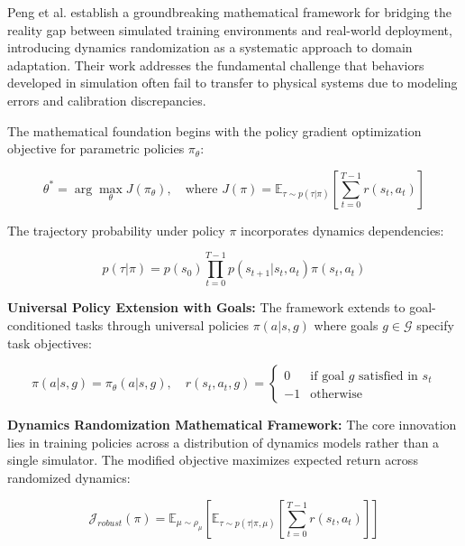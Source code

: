 \documentclass[journal]{IEEEtran}
\begin{document}
Peng et al. \cite{peng2018sim} establish a groundbreaking mathematical framework for bridging the reality gap between simulated training environments and real-world deployment, introducing dynamics randomization as a systematic approach to domain adaptation. Their work addresses the fundamental challenge that behaviors developed in simulation often fail to transfer to physical systems due to modeling errors and calibration discrepancies.

The mathematical foundation begins with the policy gradient optimization objective for parametric policies $\pi_\theta$:

\begin{equation}
\theta^* = \arg\max_\theta J(\pi_\theta), \quad \text{where } J(\pi) = \mathbb{E}_{\tau \sim p(\tau|\pi)}\left[\sum_{t=0}^{T-1} r(s_t, a_t)\right]
\label{eq:peng_policy_gradient}
\end{equation}

The trajectory probability under policy $\pi$ incorporates dynamics dependencies:

\begin{equation}
p(\tau|\pi) = p(s_0) \prod_{t=0}^{T-1} p(s_{t+1}|s_t, a_t) \pi(s_t, a_t)
\label{eq:peng_trajectory_probability}
\end{equation}

\textbf{Universal Policy Extension with Goals:} 
The framework extends to goal-conditioned tasks through universal policies $\pi(a|s,g)$ where goals $g \in \mathcal{G}$ specify task objectives:

\begin{equation}
\pi(a|s,g) = \pi_\theta(a|s,g), \quad r(s_t, a_t, g) = \begin{cases}
0 & \text{if goal } g \text{ satisfied in } s_t \\
-1 & \text{otherwise}
\end{cases}
\label{eq:peng_universal_policy}
\end{equation}

\textbf{Dynamics Randomization Mathematical Framework:}
The core innovation lies in training policies across a distribution of dynamics models rather than a single simulator. The modified objective maximizes expected return across randomized dynamics:

\begin{equation}
\mathcal{J}_{robust}(\pi) = \mathbb{E}_{\mu \sim \rho_\mu} \left[ \mathbb{E}_{\tau \sim p(\tau|\pi,\mu)} \left[ \sum_{t=0}^{T-1} r(s_t, a_t) \right] \right]
\label{eq:peng_dynamics_randomization}
\end{equation}
\end{document}
